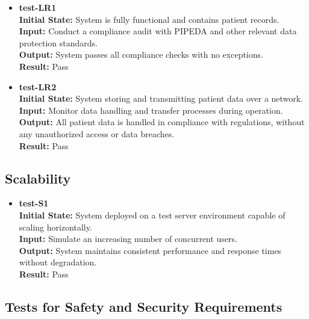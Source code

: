 \documentclass[12pt, titlepage]{article}
\begin{document}
\begin{itemize}
\item \textbf{test-LR1} \label{test-LR1} \\
\textbf{Initial State:} System is fully functional and contains patient records. \\
\textbf{Input:} Conduct a compliance audit with PIPEDA and other relevant data protection standards. \\
\textbf{Output:} System passes all compliance checks with no exceptions. \\
\textbf{Result:} Pass \\

\item \textbf{test-LR2} \label{test-LR2} \\
\textbf{Initial State:} System storing and transmitting patient data over a network. \\
\textbf{Input:} Monitor data handling and transfer processes during operation. \\
\textbf{Output:} All patient data is handled in compliance with regulations, without any unauthorized access or data breaches. \\
\textbf{Result:} Pass \\
\end{itemize}

\subsection{Scalability} \label{section:4.9}

\begin{itemize}
\item \textbf{test-S1} \label{test-S1} \\
\textbf{Initial State:} System deployed on a test server environment capable of scaling horizontally. \\
\textbf{Input:} Simulate an increasing number of concurrent users. \\
\textbf{Output:} System maintains consistent performance and response times without degradation. \\
\textbf{Result:} Pass \\
\end{itemize}

\subsection{Tests for Safety and Security Requirements} \label{section:4.10}
\end{document}
